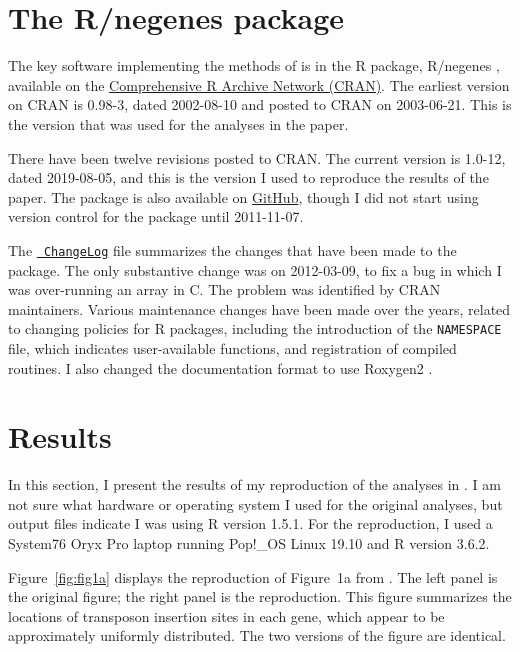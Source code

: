\section{The R/negenes package}

The key software implementing the methods of \citet{lamichhane2003}
is in the R package, R/negenes \citep{negenes}, available on the
\href{https://cran.r-project.org/package=negenes}{Comprehensive R
Archive Network (CRAN)}. The earliest version on CRAN is 0.98-3, dated
2002-08-10 and posted to CRAN on 2003-06-21. This is the version that
was used for the analyses in the paper.

There have been twelve revisions posted to CRAN. The current version
is 1.0-12, dated 2019-08-05, and this is the version I used to
reproduce the results of the paper. The package is also available on
\href{https://github.com/kbroman/negenes}{GitHub}, though I did not
start using version control for the package until 2011-11-07.

The \href{https://github.com/kbroman/negenes/blob/master/ChangeLog}{\tt
ChangeLog} file summarizes the changes that have been made to the
package. The only substantive change was on 2012-03-09, to fix a bug
in which I was over-running an array in C. The problem was identified by
CRAN maintainers. Various maintenance changes have been made over the
years, related to changing policies for R packages, including the
introduction of the {\tt NAMESPACE} file, which indicates
user-available functions, and registration of compiled routines. I
also changed the documentation format to use
Roxygen2 \citep{roxygen2}.


\section{Results}

In this section, I present the results of my reproduction of the analyses
in \citet{lamichhane2003}. I am not sure what hardware or operating
system I used for the original analyses, but output files indicate I
was using R version 1.5.1. For the reproduction, I used a System76
Oryx Pro laptop running Pop!\_OS Linux 19.10 and R version 3.6.2.

Figure~\ref{fig:fig1a} displays the
reproduction of Figure~1a from \citet{lamichhane2003}. The left panel
is the original figure; the right panel is the reproduction. This
figure summarizes the locations of transposon insertion sites in each
gene, which appear to be approximately uniformly distributed. The two
versions of the figure are identical.

